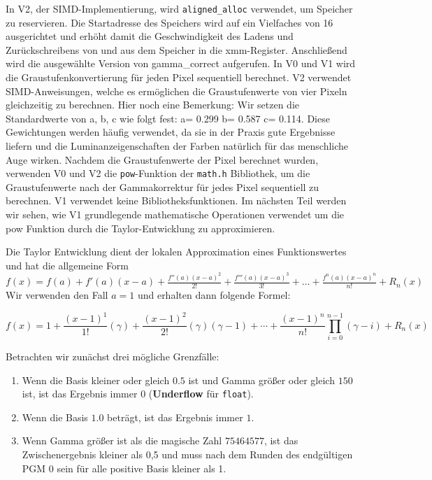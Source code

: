 \documentclass[course=erap]{aspdoc}
\begin{document}
\par
In V2, der SIMD-Implementierung, wird \texttt{aligned\_alloc}\cite{man2022aligned_alloc} verwendet, um Speicher zu reservieren. Die Startadresse des Speichers wird auf ein Vielfaches von 16 ausgerichtet und erhöht damit die Geschwindigkeit des Ladens und Zurückschreibens von und aus dem Speicher in die xmm-Register. Anschließend wird die ausgewählte Version von gamma\_correct aufgerufen. In V0 und V1 wird die Graustufenkonvertierung für jeden Pixel sequentiell berechnet. V2 verwendet SIMD-Anweisungen, welche es ermöglichen die Graustufenwerte von vier Pixeln gleichzeitig zu berechnen. Hier noch eine Bemerkung: Wir setzen die Standardwerte von a, b, c wie folgt fest: a= 0.299 b= 0.587 c= 0.114. Diese Gewichtungen werden häufig verwendet\cite{w3c1996sRGB}, da sie in der Praxis gute Ergebnisse liefern und die Luminanzeigenschaften der Farben natürlich für das menschliche Auge wirken. Nachdem die Graustufenwerte der Pixel berechnet wurden, verwenden V0 und V2 die \texttt{pow}-Funktion der \texttt{math.h} Bibliothek, um die Graustufenwerte nach der Gammakorrektur für jedes Pixel sequentiell zu berechnen. V1 verwendet keine Bibliotheksfunktionen. Im nächsten Teil werden wir sehen, wie V1 grundlegende mathematische Operationen verwendet um die pow Funktion durch die Taylor-Entwicklung zu approximieren.

\par
Die Taylor Entwicklung \cite{mathworld2024taylorseries} dient der lokalen Approximation eines Funktionswertes und hat die allgemeine Form $f(x) = f(a) + f'(a)(x-a) + \frac{{f''(a)(x-a)^2}}{2!} + \frac{{f'''(a)(x-a)^3}}{3!} + \ldots + \frac{{f^n(a)(x-a)^n}}{n!} + R_n(x) $ Wir verwenden den Fall $a=1$ und erhalten dann folgende Formel:

\begin{equation}
f(x) = 1 + \frac{(x-1)^1}{1!} (\gamma) + \frac{(x-1)^2}{2!} (\gamma)(\gamma-1)  + \cdots + \frac{(x-1)^n}{n!} \prod_{i=0}^{n-1} (\gamma-i) + R_n(x)
\end{equation}

\par
Betrachten wir zunächst drei mögliche Grenzfälle:
\begin{enumerate}
\item Wenn die Basis kleiner oder gleich \(0.5\) ist und Gamma größer oder gleich \(150\) ist, ist das Ergebnis immer \(0\) (\textbf{Underflow} für \texttt{float}).
\item Wenn die Basis \(1.0\) beträgt, ist das Ergebnis immer \(1\).
\item Wenn Gamma größer ist als die magische Zahl \(75464577\),  ist das Zwischenergebnis kleiner als 0,5 und muss nach dem Runden des endgültigen PGM 0 sein für alle positive Basis kleiner als 1.
\end{enumerate}
\end{document}
